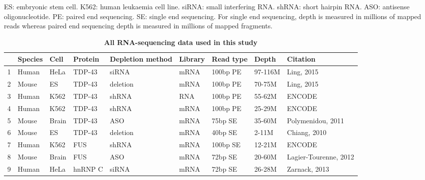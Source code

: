 \begin{table}[h!]
	\caption{\textbf{All RNA-sequencing data used in this study}}
	 ES: embryonic stem cell. K562: human leukaemia cell line. siRNA: small interfering RNA. shRNA: short hairpin RNA. ASO: antisense oligonucleotide. PE: paired end sequencing. SE: single end sequencing. For single end sequencing, depth is measured in millions of mapped reads whereas paired end sequencing depth is measured in millions of mapped fragments.
	\label{table:cryptic_data}
	\centering
		\begin{small}
			\begin{tabular}{l|lllp{1.5cm}llll}
				& Species & Cell & Protein & Depletion method & Library & Read type & Depth & Citation\\
				\hline
				1 & Human & HeLa & TDP-43 & siRNA & mRNA & 100bp PE & 97-116M & Ling, 2015\\
				2 & Mouse & ES & TDP-43 & deletion & mRNA & 100bp PE & 70-75M & Ling, 2015\\
				3 & Human & K562 & TDP-43 & shRNA & RNA & 100bp PE & 55-62M & ENCODE\\
				4 & Human & K562 & TDP-43 & shRNA & mRNA & 100bp PE & 25-29M & ENCODE\\
				5 & Mouse & Brain & TDP-43 & ASO & mRNA & 75bp SE & 35-60M & Polymenidou, 2011\\
				6 & Mouse & ES & TDP-43 & deletion & mRNA & 40bp SE & 2-11M & Chiang, 2010\\
				7 & Human & K562 & FUS & shRNA & mRNA & 100bp SE & 12-21M & ENCODE\\
				8 & Mouse & Brain & FUS & ASO & mRNA & 72bp SE & 20-60M & Lagier-Tourenne, 2012\\
				9 & Human & HeLa & hnRNP C & siRNA & mRNA & 72bp SE & 26-28M & Zarnack, 2013\\
			\end{tabular}
		\end{small}
\end{table}


